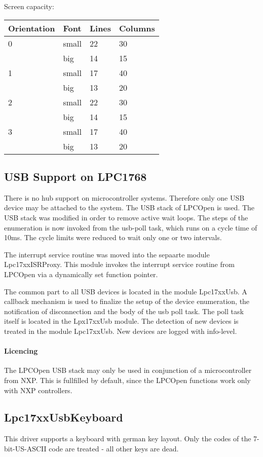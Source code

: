 Screen capacity:

\begin{tabular}{|l|l|l|l|}
\hline
Orientation & Font & Lines & Columns \\
\hline
 0 & small & 22 & 30  \\
   & big   & 14 & 15 \\
\hline
1 & small & 17 & 40 \\
  & big &   13 & 20 \\
\hline
 2 & small & 22 & 30  \\
   & big   & 14 & 15 \\
\hline
3 & small & 17 & 40 \\
  & big &   13 & 20 \\
\hline
\end{tabular}

\subsection{USB Support on LPC1768}
There is no hub support on microcontroller systems. Therefore only one USB device
may be attached to the system.
The USB stack of LPCOpen is used.
The USB stack was modified in order to remove active wait loops.
The steps of the enumeration is now invoked from the usb-poll task, which
runs on a cycle time of 10ms. The cycle limits were reduced to wait only one 
or two intervals.

The interrupt service routine was moved into the sepaarte module Lpc17xxISRProxy. 
This module invokes the interrupt service routine from LPCOpen via a
 dynamically set function pointer.

The common part to all USB devices is located in the module Lpc17xxUsb. 
A callback mechanism is used to finalize the setup of the device enumeration,
the notification of disconnection and the body of the usb poll task. The poll task
itself is located in the Lpx17xxUsb module.
The detection of new devices is treated in the module Lpc17xxUsb. New devices are logged 
with info-level.

\paragraph{Licencing}
The LPCOpen USB stack may only be used in conjunction of a microcontroller from NXP.
This is fullfilled by default, since the LPCOpen functions work only with NXP
controllers.

\subsection{Lpc17xxUsbKeyboard}
This driver supports a keyboard with german key layout.
Only the codes of the 7-bit-US-ASCII code are treated - all other
keys are dead.

